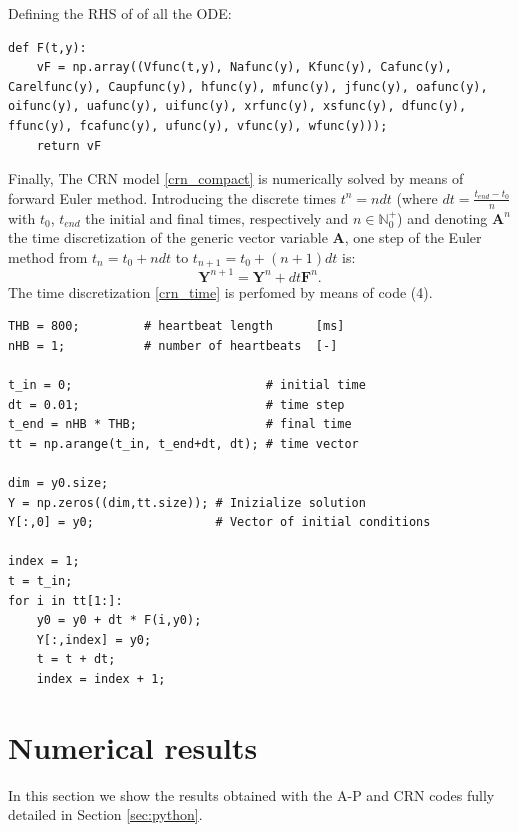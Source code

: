 \documentclass[11pt,a4paper]{article}
\begin{document}
Defining the RHS of of all the ODE:
\lstset{language=Python}
\lstset{frame=lines}
\lstset{basicstyle=\footnotesize}
\begin{lstlisting}
def F(t,y):
	vF = np.array((Vfunc(t,y), Nafunc(y), Kfunc(y), Cafunc(y), Carelfunc(y), Caupfunc(y), hfunc(y), mfunc(y), jfunc(y), oafunc(y), oifunc(y), uafunc(y), uifunc(y), xrfunc(y), xsfunc(y), dfunc(y), ffunc(y), fcafunc(y), ufunc(y), vfunc(y), wfunc(y)));
	return vF
\end{lstlisting}

Finally, The CRN model \eqref{crn_compact} is numerically solved by means of forward Euler method. Introducing the discrete times $t^n=n dt$  (where $dt=\frac{t_{end}-t_{0}}{n}$ with $t_0$, $t_{end}$ the initial and final times, respectively and $n \in \mathbb {N}_0^+$) and denoting $\mathbf{A}^{n}$ the time discretization of the generic vector variable $\mathbf{A}$, one step of the Euler method from $t_n=t_0 + ndt$ to $t_{n+1}=t_0 + (n+1)dt$ is: 
\begin{equation}
\label{crn_time}
\mathbf{Y}^{n+1}=\mathbf{Y}^{n}+dt\mathbf{F}^n.
\end{equation}
The time discretization \eqref{crn_time} is perfomed by means of code (4).

\lstset{language=Python}
\lstset{frame=lines}
\lstset{basicstyle=\footnotesize}
\begin{lstlisting}
THB = 800;         # heartbeat length      [ms]
nHB = 1;           # number of heartbeats  [-]

t_in = 0;                           # initial time
dt = 0.01;                          # time step
t_end = nHB * THB;                  # final time
tt = np.arange(t_in, t_end+dt, dt); # time vector

dim = y0.size;  
Y = np.zeros((dim,tt.size)); # Inizialize solution
Y[:,0] = y0;                 # Vector of initial conditions

index = 1;
t = t_in;
for i in tt[1:]:
	y0 = y0 + dt * F(i,y0);
	Y[:,index] = y0;
	t = t + dt;
	index = index + 1;
\end{lstlisting}

\section{Numerical results}\label{sec:results}
In this section we show the results obtained with the A-P and CRN codes fully detailed in Section \ref{sec:python}.
\end{document}
